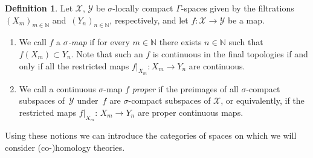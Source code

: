 \documentclass[pdftex]{sigma}
\numberwithin{equation}{section}
\theoremstyle{definition}
\newtheorem{defn}[thm]{Definition}
\newcommand{\N}{\mathbb{N}}
\newcommand{\cX}{\mathcal{X}}
\newcommand{\cY}{\mathcal{Y}}
\begin{document}
\begin{defn}
Let $\cX$, $\cY$ be $\sigma$-locally compact $\Gamma$-spaces given by the filtrations $(X_m)_{m\in\N}$ and~$(Y_n)_{n\in\N}$, respectively, and let $f\colon\cX\to\cY$ be a map.
\begin{enumerate}\itemsep=0pt
\item[$\bullet$] We call $f$ a \emph{$\sigma$-map} if for every $m\in\N$ there exists $n\in\N$ such that $f(X_m)\subset Y_n$.
Note that such an $f$ is continuous in the final topologies if and only if all the restricted maps $f|_{X_m}\colon X_m\to Y_n$ are continuous.
\item[$\bullet$] We call a continuous $\sigma$-map $f$ \emph{proper} if the preimages of all $\sigma$-compact subspaces of~$\cY$ under~$f$ are $\sigma$-compact subspaces of $\cX$, or equivalently, if the restricted maps $f|_{X_m}$: $X_m\to Y_n$ are proper continuous maps.
\end{enumerate}
\end{defn}

Using these notions we can introduce the categories of spaces on which we will consider \mbox{(co-)}homology theories.
\end{document}
